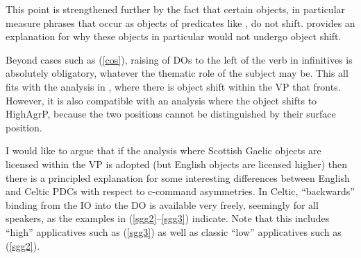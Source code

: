 \documentclass[output=paper,colorlinks,citecolor=brown]{langscibook}
\begin{document}


\noindent This point is strengthened further by the fact that certain objects, in particular measure phrases that occur as objects of predicates like , do not shift. \citet{gt:Adger:1994} provides an explanation for why these objects in particular would not undergo object shift.


\noindent Beyond cases such as (\ref{cos}), raising of DOs to the left of the verb in infinitives is absolutely obligatory, whatever the thematic role of the subject may be. This all fits with the analysis in , where there is object shift within the VP that fronts. However, it is also compatible with an analysis where the object shifts to HighAgrP, because the two positions cannot be distinguished by their surface position. 

I would like to argue that if the analysis where Scottish Gaelic objects are licensed within the VP is adopted (but English objects are licensed higher) then there is a principled explanation for some interesting differences between English and Celtic PDCs with respect to c-command asymmetries. In Celtic, ``backwards'' binding from the IO into the DO is available very freely, seemingly for all speakers, as the examples in (\ref{sgg2}--\ref{sgg3}) indicate. Note that this includes ``high'' applicatives such as (\ref{sgg3}) as well as classic ``low'' applicatives such as (\ref{sgg2}). 

\end{document}
